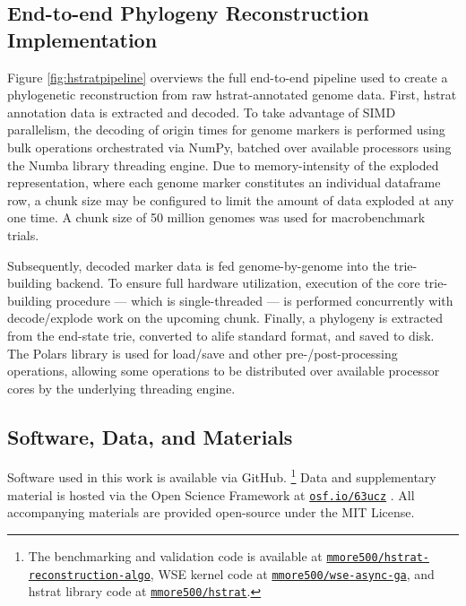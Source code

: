 \subsection{End-to-end Phylogeny Reconstruction Implementation}
\label{sec:pipeline}



Figure \ref{fig:hstratpipeline} overviews the full end-to-end pipeline used to create a phylogenetic reconstruction from raw hstrat-annotated genome data.
First, hstrat annotation data is extracted and decoded.
To take advantage of SIMD parallelism, the decoding of origin times for genome markers is performed using bulk operations orchestrated via NumPy, batched over available processors using the Numba library threading engine.
Due to memory-intensity of the exploded representation, where each genome marker constitutes an individual dataframe row, a chunk size may be configured to limit the amount of data exploded at any one time.
A chunk size of 50 million genomes was used for macrobenchmark trials.

Subsequently, decoded marker data is fed genome-by-genome into the trie-building backend.
To ensure full hardware utilization, execution of the core trie-building procedure --- which is single-threaded --- is performed concurrently with decode/explode work on the upcoming chunk.
Finally, a phylogeny is extracted from the end-state trie, converted to alife standard format, and saved to disk.
The Polars library is used for load/save and other pre-/post-processing operations, allowing some operations to be distributed over available processor cores by the underlying threading engine.

\subsection{Software, Data, and Materials} \label{sec:materials}

Software used in this work is available via GitHub.%
\footnote{The benchmarking and validation code is available at \href{https://github.com/mmore500/hstrat-reconstruction-algo}{\texttt{mmore500/hstrat-reconstruction-algo}}, WSE kernel code at \href{https://github.com/mmore500/wse-async-ga}{\texttt{mmore500/wse-async-ga}}, and hstrat library code at \href{https://github.com/mmore500/hstrat}{\texttt{mmore500/hstrat}}.}
Data and supplementary material is hosted via the Open Science Framework at \href{https://osf.io/63ucz/?view_only=2e3ec335c016436494ad125b14ffc8cb}{\texttt{osf.io/63ucz}} \citep{supplemental,foster2017open}.
All accompanying materials are provided open-source under the MIT License.

